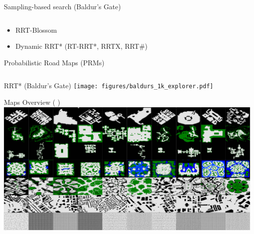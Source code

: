 \documentclass[aspectratio=169]{beamer}
\makeatletter
\newcommand{\white}[1]{{\color{pureminimalistic@text@white} #1}}
\newcommand{\red}[1]{{\color{pureminimalistic@text@red} #1}}
\makeatother
\begin{document}
\begin{frame}[plain]{Sampling-based search \white{(Baldur's Gate)}}
\begin{columns}[T]
\begin{column}{.65\linewidth}
\begin{vfilleditems}
\begin{itemize}
                  \item RRT-Blossom
                  \item Dynamic RRT* (RT-RRT*, RRTX, RRT#)
              \end{itemize}
              \vspace{1em}
              \item {\Large Probabilistic Road Maps \red{(PRMs)}}
          \end{vfilleditems}
      \end{column}
  \end{columns}
\end{frame}

\begin{frame}[plain]{RRT* \white{(Baldur's Gate)}}
    \texttt{[image: figures/baldurs\_1k\_explorer.pdf]}
\end{frame}

\begin{frame}{Maps Overview {\Medium \color{white}( \cite{sturtevant2012benchmarks})}}
    \includegraphics[width=0.95\linewidth, keepaspectratio]{figures/show_maps_overview.pdf}
\end{frame}
\end{document}
